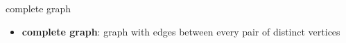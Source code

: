 \begin{frame}{complete graph}
\begin{itemize}
\item \textbf{complete graph}: graph with edges between every pair of distinct vertices
\end{itemize}
\end{frame}
